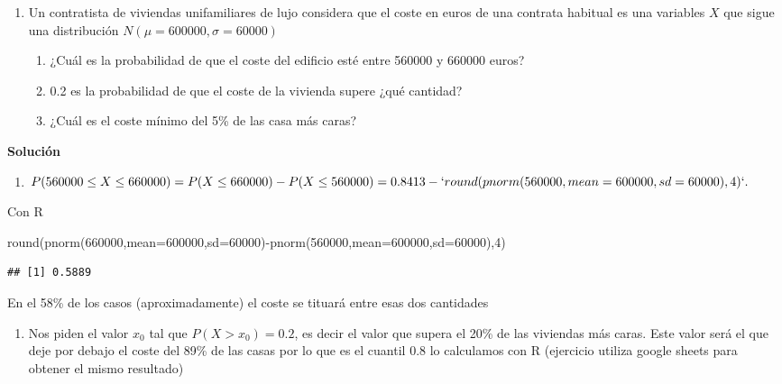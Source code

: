\documentclass[
]{article}
\newenvironment{Shaded}{\begin{snugshade}}{\end{snugshade}}
\newcommand{\AttributeTok}[1]{\textcolor[rgb]{0.77,0.63,0.00}{#1}}
\newcommand{\DecValTok}[1]{\textcolor[rgb]{0.00,0.00,0.81}{#1}}
\newcommand{\FunctionTok}[1]{\textcolor[rgb]{0.00,0.00,0.00}{#1}}
\newcommand{\NormalTok}[1]{#1}
\newcommand{\SpecialCharTok}[1]{\textcolor[rgb]{0.00,0.00,0.00}{#1}}
\providecommand{\tightlist}{%
  \setlength{\itemsep}{0pt}\setlength{\parskip}{0pt}}
\begin{document}
\begin{enumerate}
\def\labelenumi{\arabic{enumi}.}
\setcounter{enumi}{5}
\tightlist
\item
  Un contratista de viviendas unifamiliares de lujo considera que el
  coste en euros de una contrata habitual es una variables \(X\) que
  sigue una distribución \(N(\mu=600000,\sigma=60000)\)

  \begin{enumerate}
  \def\labelenumii{\alph{enumii}.}
  \tightlist
  \item
    ¿Cuál es la probabilidad de que el coste del edificio esté entre
    560000 y 660000 euros?
  \item
    0.2 es la probabilidad de que el coste de la vivienda supere ¿qué
    cantidad?
  \item
    ¿Cuál es el coste mínimo del 5\% de las casa más caras?
  \end{enumerate}
\end{enumerate}

\textbf{Solución}

\begin{enumerate}
\def\labelenumi{\alph{enumi}.}
\tightlist
\item
  \(P(560000\leq X\leq 660000)=P(X\leq 660000)-P(X\leq 560000)=0.8413-`round(pnorm(560000,mean=600000,sd=60000),4)`.\)
\end{enumerate}

Con R

\begin{Shaded}
\begin{Highlighting}[]
\FunctionTok{round}\NormalTok{(}\FunctionTok{pnorm}\NormalTok{(}\DecValTok{660000}\NormalTok{,}\AttributeTok{mean=}\DecValTok{600000}\NormalTok{,}\AttributeTok{sd=}\DecValTok{60000}\NormalTok{)}\SpecialCharTok{{-}}\FunctionTok{pnorm}\NormalTok{(}\DecValTok{560000}\NormalTok{,}\AttributeTok{mean=}\DecValTok{600000}\NormalTok{,}\AttributeTok{sd=}\DecValTok{60000}\NormalTok{),}\DecValTok{4}\NormalTok{)}
\end{Highlighting}
\end{Shaded}

\begin{verbatim}
## [1] 0.5889
\end{verbatim}

En el 58\% de los casos (aproximadamente) el coste se tituará entre esas
dos cantidades

\begin{enumerate}
\def\labelenumi{\alph{enumi}.}
\setcounter{enumi}{1}
\tightlist
\item
  Nos piden el valor \(x_0\) tal que \(P(X>x_0)=0.2\), es decir el valor
  que supera el 20\% de las viviendas más caras. Este valor será el que
  deje por debajo el coste del 89\% de las casas por lo que es el
  cuantil 0.8 lo calculamos con R (ejercicio utiliza google sheets para
  obtener el mismo resultado)
\end{enumerate}
\end{document}

